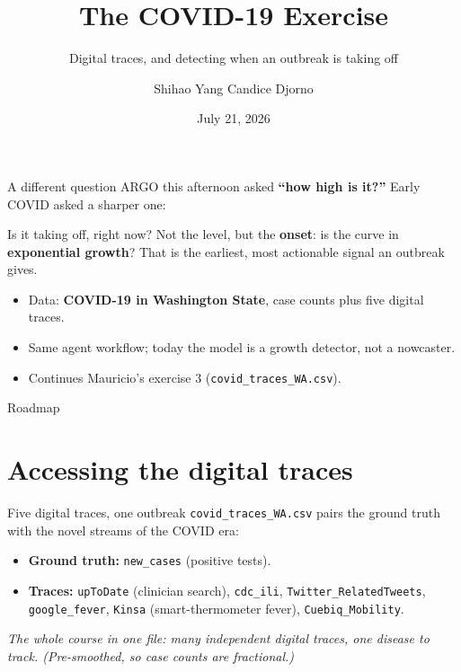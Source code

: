 \documentclass[aspectratio=169,11pt]{beamer}
\title{The COVID-19 Exercise}
\subtitle{Digital traces, and detecting when an outbreak is taking off}
\author{Shihao Yang \quad\textbullet\quad Candice Djorno}
\institute{SISMID 2026 \textbullet\ Day 2, 3:30}
\date{July 21, 2026}
\begin{document}
\begin{frame}
  \titlepage
\end{frame}

\begin{frame}{A different question}
  ARGO this afternoon asked \textbf{``how high is it?''} Early COVID asked a sharper one:
  \begin{block}{Is it taking off, right now?}
    Not the level, but the \textbf{onset}: is the curve in \textbf{exponential growth}? That
    is the earliest, most actionable signal an outbreak gives.
  \end{block}
  \vspace{0.3em}
  \begin{itemize}
    \item Data: \textbf{COVID-19 in Washington State}, case counts plus five digital traces.
    \item Same agent workflow; today the model is a growth detector, not a nowcaster.
    \item Continues Mauricio's exercise 3 (\texttt{covid\_traces\_WA.csv}).
  \end{itemize}
\end{frame}

\begin{frame}{Roadmap}
  \tableofcontents
\end{frame}

\section{Accessing the digital traces}

\begin{frame}{Five digital traces, one outbreak}
  \texttt{covid\_traces\_WA.csv} pairs the ground truth with the novel streams of the COVID
  era:
  \begin{itemize}
    \item \textbf{Ground truth:} \texttt{new\_cases} (positive tests).
    \item \textbf{Traces:} \texttt{upToDate} (clinician search), \texttt{cdc\_ili},
          \texttt{Twitter\_RelatedTweets}, \texttt{google\_fever}, \texttt{Kinsa}
          (smart-thermometer fever), \texttt{Cuebiq\_Mobility}.
  \end{itemize}
  \vspace{0.3em}
  \begin{center}
    \itshape The whole course in one file: many independent digital traces, one disease to
    track. (Pre-smoothed, so case counts are fractional.)
  \end{center}
\end{frame}
\end{document}
